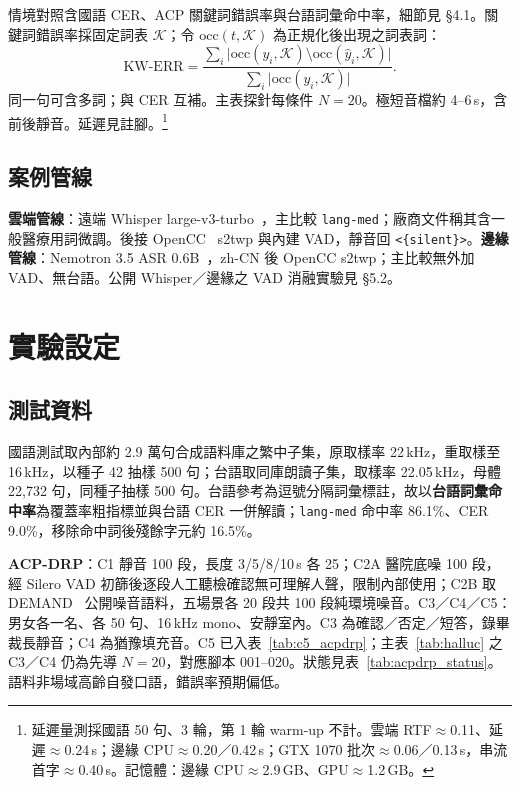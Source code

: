 \documentclass[11pt,a4paper]{article}
\newcommand{\CloudASR}{雲端管線}
\newcommand{\EdgeASR}{邊緣管線}
\begin{document}
情境對照含國語 CER、ACP 關鍵詞錯誤率與台語詞彙命中率，細節見 §4.1。關鍵詞錯誤率採固定詞表 $\mathcal{K}$；令 $\mathrm{occ}(t,\mathcal{K})$ 為正規化後出現之詞表詞：
\begin{equation}
\mathrm{KW\text{-}ERR}
= \frac{\sum_i \bigl|\mathrm{occ}(y_i,\mathcal{K})\setminus\mathrm{occ}(\hat{y}_i,\mathcal{K})\bigr|}
{\sum_i \bigl|\mathrm{occ}(y_i,\mathcal{K})\bigr|}. \label{eq:kwerr}
\end{equation}
同一句可含多詞；與 CER 互補。主表探針每條件 $N{=}20$。極短音檔約 4--6\,s，含前後靜音。延遲見註腳。\footnote{延遲量測採國語 50 句、3 輪，第 1 輪 warm-up 不計。雲端 RTF$\approx$0.11、延遲$\approx$0.24\,s；邊緣 CPU$\approx$0.20／0.42\,s；GTX 1070 批次$\approx$0.06／0.13\,s，串流首字$\approx$0.40\,s。記憶體：邊緣 CPU$\approx$2.9\,GB、GPU$\approx$1.2\,GB。}



\subsection{案例管線}

\textbf{\CloudASR{}}：遠端 Whisper large-v3-turbo~\citep{openai2024whisperturbo,radford2023whisper}，主比較 \texttt{lang-med}；廠商文件稱其含一般醫療用詞微調。後接 OpenCC~\citep{opencc} s2twp 與內建 VAD，靜音回 \texttt{<\{silent\}>}。\textbf{\EdgeASR{}}：Nemotron 3.5 ASR 0.6B~\citep{nvidia2026nemotron}，zh-CN 後 OpenCC s2twp；主比較無外加 VAD、無台語。公開 Whisper／邊緣之 VAD 消融實驗見 §5.2。

\section{實驗設定}

\subsection{測試資料}

國語測試取內部約 2.9 萬句合成語料庫之繁中子集，原取樣率 22\,kHz，重取樣至 16\,kHz，以種子 42 抽樣 500 句；台語取同庫朗讀子集，取樣率 22.05\,kHz，母體 22,732 句，同種子抽樣 500 句。台語參考為逗號分隔詞彙標註，故以\textbf{台語詞彙命中率}為覆蓋率粗指標並與台語 CER 一併解讀；\texttt{lang-med} 命中率 86.1\%、CER 9.0\%，移除命中詞後殘餘字元約 16.5\%。

\textbf{ACP-DRP}：C1 靜音 100 段，長度 3/5/8/10\,s 各 25；C2A 醫院底噪 100 段，經 Silero VAD 初篩後逐段人工聽檢確認無可理解人聲，限制內部使用；C2B 取 DEMAND~\citep{thiemann2013demand} 公開噪音語料，五場景各 20 段共 100 段純環境噪音。C3／C4／C5：男女各一名、各 50 句、16\,kHz mono、安靜室內。C3 為確認／否定／短答，錄畢裁長靜音；C4 為猶豫填充音。C5 已入表~\ref{tab:c5_acpdrp}；主表~\ref{tab:halluc} 之 C3／C4 仍為先導 $N{=}20$，對應腳本 001--020。狀態見表~\ref{tab:acpdrp_status}。語料非場域高齡自發口語，錯誤率預期偏低。
\end{document}
